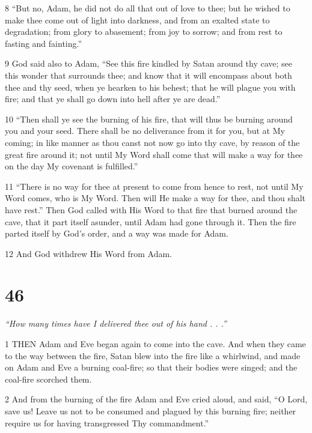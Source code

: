 \par 8 “But no, Adam, he did not do all that out of love to thee; but he wished to make thee come out of light into darkness, and from an exalted state to degradation; from glory to abasement; from joy to sorrow; and from rest to fasting and fainting.”

\par 9 God said also to Adam, “See this fire kindled by Satan around thy cave; see this wonder that surrounds thee; and know that it will encompass about both thee and thy seed, when ye hearken to his behest; that he will plague you with fire; and that ye shall go down into hell after ye are dead.”

\par 10 “Then shall ye see the burning of his fire, that will thus be burning around you and your seed. There shall be no deliverance from it for you, but at My coming; in like manner as thou canst not now go into thy cave, by reason of the great fire around it; not until My Word shall come that will make a way for thee on the day My covenant is fulfilled.”

\par 11 “There is no way for thee at present to come from hence to rest, not until My Word comes, who is My Word. Then will He make a way for thee, and thou shalt have rest.” Then God called with His Word to that fire that burned around the cave, that it part itself asunder, until Adam had gone through it. Then the fire parted itself by God's order, and a way was made for Adam.

\par 12 And God withdrew His Word from Adam.

\chapter{46}

\par \textit{“How many times have I delivered thee out of his hand . . .”}

\par 1 THEN Adam and Eve began again to come into the cave. And when they came to the way between the fire, Satan blew into the fire like a whirlwind, and made on Adam and Eve a burning coal-fire; so that their bodies were singed; and the coal-fire scorched them.

\par 2 And from the burning of the fire Adam and Eve cried aloud, and said, “O Lord, save us! Leave us not to be consumed and plagued by this burning fire; neither require us for having transgressed Thy commandment.”


